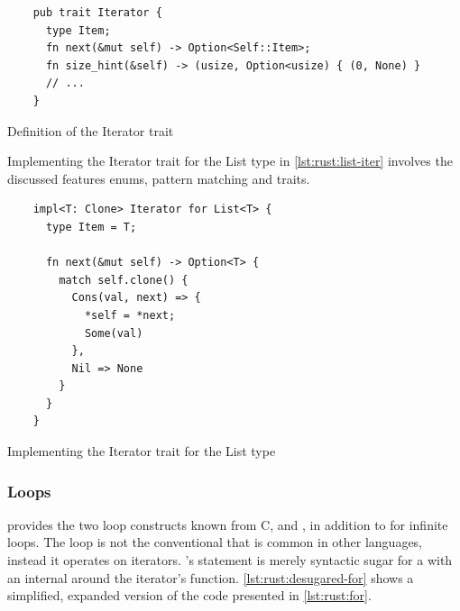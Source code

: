 \begin{listing}[H]
  \begin{verbatim}
    pub trait Iterator {
      type Item;
      fn next(&mut self) -> Option<Self::Item>;
      fn size_hint(&self) -> (usize, Option<usize) { (0, None) }
      // ...
    }
  \end{verbatim}
  \caption{Definition of the Iterator trait}
  \label{lst:rust:iterator}
\end{listing}

Implementing the Iterator trait for the List type in \autoref{lst:rust:list-iter} involves the discussed features enums, pattern matching and traits.

\begin{listing}[H]
  \begin{verbatim}
    impl<T: Clone> Iterator for List<T> {
      type Item = T;

      fn next(&mut self) -> Option<T> {
        match self.clone() {
          Cons(val, next) => {
            *self = *next;
            Some(val)
          },
          Nil => None
        }
      }
    }
  \end{verbatim}
  \caption{Implementing the Iterator trait for the List type}
  \label{lst:rust:list-iter}
\end{listing}


\subsubsection{Loops}

\rust provides the two loop constructs known from C,  and , in addition to  for infinite loops.
The  loop is not the conventional  that is common in other languages, instead it operates on iterators.
\rust's  statement is merely syntactic sugar for a  with an internal  around the iterator's  function.
\autoref{lst:rust:desugared-for} shows a simplified, expanded version of the code presented in \autoref{lst:rust:for}.


